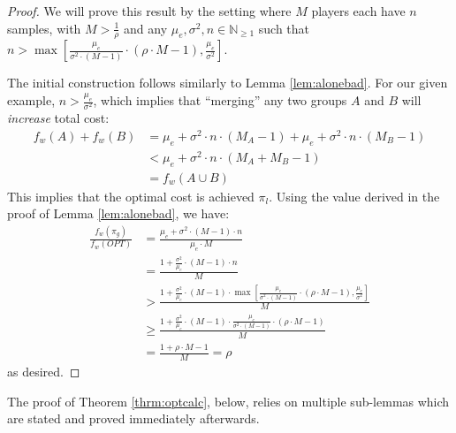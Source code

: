 \documentclass{article}
\newcommand{\p}[1]{\left( #1 \right)}
\newcommand{\br}[1]{\left[ #1 \right]}
\newcommand{\cd}[0]{\cdot}
\newcommand{\nplayer}[0]{\ensuremath{M}}
\newcommand{\mue}[0]{\ensuremath{\mu_e}}
\newcommand{\var}[0]{\ensuremath{\sigma^2}}
\newcommand{\ndraw}[0]{\ensuremath{n}}
\newcommand{\alone}[0]{\ensuremath{\pi_l}}
\newcommand{\gcol}[0]{\ensuremath{\pi_g}}
\newcommand{\costw}[0]{\ensuremath{f_w}}
\begin{document}
\gcolbad*
\begin{proof}

We will prove this result by the setting where $\nplayer$ players each have $\ndraw$ samples, with $\nplayer > \frac{1}{\rho}$ and any $\mue, \var, \ndraw \in \mathbb{N}_{\geq 1}$ such that $\ndraw >\max \br{ \frac{\mue}{\var \cd (\nplayer-1)} \cd \p{\rho \cd \nplayer - 1}, \frac{\mue}{\var}}$. 

The initial construction follows similarly to Lemma \ref{lem:alonebad}. For our given example, $\ndraw > \frac{\mue}{\var}$, which implies that \enquote{merging} any two groups $A$ and $B$ will \emph{increase} total cost: 
\begin{align*}
\costw(A) + \costw(B) &= \mue + \var \cd \ndraw \cd (\nplayer_A -1)+ \mue + \var \cd \ndraw \cd (\nplayer_B -1)\\
&< \mue + \var \cd \ndraw \cd (\nplayer_A + \nplayer_B -1) \\
&= \costw(A \cup B)
\end{align*}
This implies that the optimal cost is achieved $\alone$. Using the value derived in the proof of Lemma \ref{lem:alonebad}, we have: 
\begin{align*}
\frac{\costw(\gcol)}{\costw(OPT)} &=\frac{\mue + \var \cd (\nplayer-1) \cd \ndraw}{\mue \cd \nplayer} \\
&= \frac{1 + \frac{\var}{\mue} \cd (\nplayer -1) \cd \ndraw}{\nplayer} \\
&> \frac{1 + \frac{\var}{\mue} \cd (\nplayer -1) \cd \max \br{ \frac{\mue}{\var \cd (\nplayer-1)} \cd \p{\rho \cd \nplayer - 1}, \frac{\mue}{\var}}}{\nplayer} \\
&\geq \frac{1 + \frac{\var}{\mue} \cd (\nplayer -1) \cd \frac{\mue}{\var \cd (\nplayer-1)} \cd \p{\rho \cd \nplayer - 1}}{\nplayer}\\
&=\frac{1 +\rho \cd \nplayer - 1}{\nplayer} = \rho
\end{align*}
as desired. 
\end{proof}

The proof of Theorem \ref{thrm:optcalc}, below, relies on multiple sub-lemmas which are stated and proved immediately afterwards. 

\optcalc*
\end{document}
